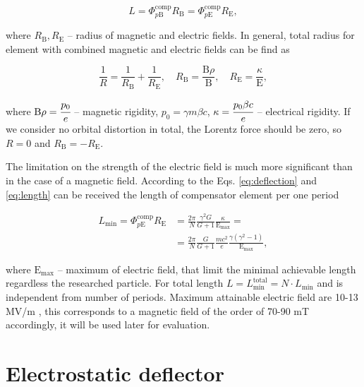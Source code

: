 \documentclass[a4paper,
               keeplastbox,   %
               ]{jacow}
\begin{document}
\begin{equation}
	L = \Phi_{p\mathrm{B}}^{\text{comp}}R_{\mathrm{B}} = \Phi_{p\mathrm{E}}^{\text{comp}}R_{\mathrm{E}},
	\label{eq:length}
\end{equation}

\noindent where $R_{\mathrm{B}}, R_{\mathrm{E}}$ -- radius of magnetic and electric fields. In general, total radius for element with combined magnetic and electric fields can be find as

\begin{equation}
	\frac{1}{R} = \frac{1}{R_{\mathrm{B}}}+\frac{1}{R_{\mathrm{E}}}, \quad R_{\mathrm{B}}=\frac{\mathrm{B}\rho}{\mathrm{B}}, \quad R_{\mathrm{E}}=\frac{\kappa}{\mathrm{E}},    
	\label{eq:total_radius}
\end{equation}

\noindent where $\mathrm{B}\rho = \cfrac{p_{0}}{e}$ -- magnetic rigidity, $p_{0} = \gamma m\beta c$, $\kappa = \cfrac{p_{0}\beta c}{e}$ -- electrical rigidity. If we consider no orbital distortion in total, the Lorentz force should be zero, so $R=0$ and $R_{\mathrm{B}} = -R_{\mathrm{E}}$.

The limitation on the strength of the electric field is much more significant than in the case of a magnetic field. According to the Eqs. \ref{eq:deflection} and \ref{eq:length} can be received the length of compensator element per one period

\begin{equation}
	\begin{aligned}
		L_{\text{min}} = \Phi_{p\mathrm{E}}^{\text{comp}}R_{\mathrm{E}} & = 
		\frac{2\pi}{N}\frac{\gamma^2 G}{G+1}\frac{\kappa}{\mathrm{E}_{\text{max}}} = \\
		& = \frac{2\pi}{N}\frac{G}{G+1}\frac{mc^2}{e}\frac{\gamma(\gamma^2-1)}{\mathrm{E}_{\text{max}}},
		\label{eq:length_min}
	\end{aligned}
\end{equation}

\noindent where $\mathrm{E}_{\text{max}}$ -- maximum of electric field, that limit the minimal achievable length regardless the researched particle. For total length $L=L_{\text{min}}^{\text{total}} = N\cdot L_{\text{min}}$ and is independent from number of periods. Maximum attainable electric field are 10-13 MV/m \cite{wien}, this corresponds to a magnetic field of the order of 70-90 mT accordingly, it will be used later for evaluation.

\section{Electrostatic deflector}
\end{document}
